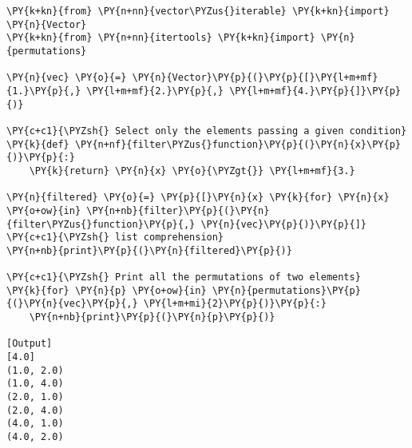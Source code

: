 \begin{Verbatim}[label=\makebox{\url{https://github.com/lucabaldini/cmepda/tree/master/slides/latex/snippets/vector\_iterable\_test.py}},commandchars=\\\{\}]
\PY{k+kn}{from} \PY{n+nn}{vector\PYZus{}iterable} \PY{k+kn}{import} \PY{n}{Vector}
\PY{k+kn}{from} \PY{n+nn}{itertools} \PY{k+kn}{import} \PY{n}{permutations}

\PY{n}{vec} \PY{o}{=} \PY{n}{Vector}\PY{p}{(}\PY{p}{[}\PY{l+m+mf}{1.}\PY{p}{,} \PY{l+m+mf}{2.}\PY{p}{,} \PY{l+m+mf}{4.}\PY{p}{]}\PY{p}{)}

\PY{c+c1}{\PYZsh{} Select only the elements passing a given condition}
\PY{k}{def} \PY{n+nf}{filter\PYZus{}function}\PY{p}{(}\PY{n}{x}\PY{p}{)}\PY{p}{:}
    \PY{k}{return} \PY{n}{x} \PY{o}{\PYZgt{}} \PY{l+m+mf}{3.}
    
\PY{n}{filtered} \PY{o}{=} \PY{p}{[}\PY{n}{x} \PY{k}{for} \PY{n}{x} \PY{o+ow}{in} \PY{n+nb}{filter}\PY{p}{(}\PY{n}{filter\PYZus{}function}\PY{p}{,} \PY{n}{vec}\PY{p}{)}\PY{p}{]} \PY{c+c1}{\PYZsh{} list comprehension}
\PY{n+nb}{print}\PY{p}{(}\PY{n}{filtered}\PY{p}{)}

\PY{c+c1}{\PYZsh{} Print all the permutations of two elements}
\PY{k}{for} \PY{n}{p} \PY{o+ow}{in} \PY{n}{permutations}\PY{p}{(}\PY{n}{vec}\PY{p}{,} \PY{l+m+mi}{2}\PY{p}{)}\PY{p}{:}
    \PY{n+nb}{print}\PY{p}{(}\PY{n}{p}\PY{p}{)}

[Output]
[4.0]
(1.0, 2.0)
(1.0, 4.0)
(2.0, 1.0)
(2.0, 4.0)
(4.0, 1.0)
(4.0, 2.0)
\end{Verbatim}